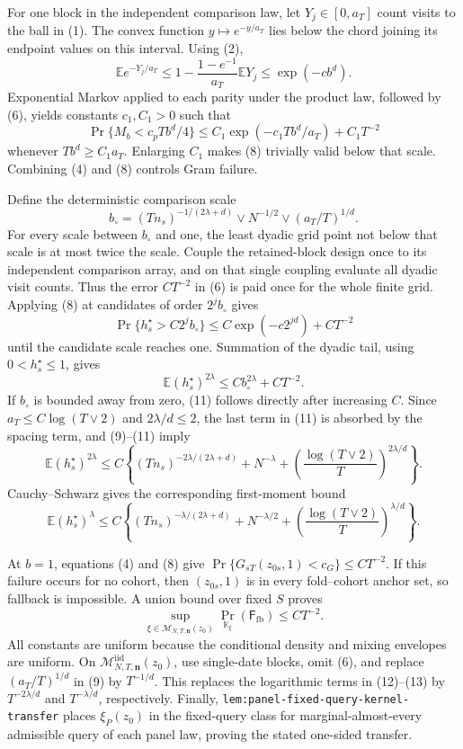 For one block in the independent comparison law, let \(Y_j\in[0,a_T]\) count visits to the ball in (1).  The convex function \(y\mapsto e^{-y/a_T}\) lies below the chord joining its endpoint values on this interval.  Using (2),
\[
 \mathbb Ee^{-Y_j/a_T}
 \le1-\frac{1-e^{-1}}{a_T}\mathbb EY_j
 \le\exp(-c b^d).                                          \tag{7}
\]
Exponential Markov applied to each parity under the product law, followed by (6), yields constants \(c_1,C_1>0\) such that
\[
 \Pr\{M_b<c_pTb^d/4\}
 \le C_1\exp(-c_1Tb^d/a_T)+C_1T^{-2}                       \tag{8}
\]
whenever \(Tb^d\ge C_1a_T\).  Enlarging \(C_1\) makes (8) trivially valid below that scale.  Combining (4) and (8) controls Gram failure.

Define the deterministic comparison scale
\[
 b_\circ=(Tn_s)^{-1/(2\lambda+d)}\vee N^{-1/2}
 \vee(a_T/T)^{1/d}.                                        \tag{9}
\]
For every scale between \(b_\circ\) and one, the least dyadic grid point not below that scale is at most twice the scale.  Couple the retained-block design once to its independent comparison array, and on that single coupling evaluate all dyadic visit counts.  Thus the error \(CT^{-2}\) in (6) is paid once for the whole finite grid.  Applying (8) at candidates of order \(2^jb_\circ\) gives
\[
 \Pr\{h_s^\star>C2^jb_\circ\}
 \le C\exp(-c2^{jd})+CT^{-2}                               \tag{10}
\]
until the candidate scale reaches one.  Summation of the dyadic tail, using \(0<h_s^\star\le1\), gives
\[
 \mathbb E(h_s^\star)^{2\lambda}
 \le Cb_\circ^{2\lambda}+CT^{-2}.                         \tag{11}
\]
If \(b_\circ\) is bounded away from zero, (11) follows directly after increasing \(C\).  Since \(a_T\le C\log(T\vee2)\) and \(2\lambda/d\le2\), the last term in (11) is absorbed by the spacing term, and (9)--(11) imply
\[
 \mathbb E(h_s^\star)^{2\lambda}
 \le C\left\{(Tn_s)^{-2\lambda/(2\lambda+d)}+N^{-\lambda}
 +\left(\frac{\log(T\vee2)}{T}\right)^{2\lambda/d}\right\}. \tag{12}
\]
Cauchy--Schwarz gives the corresponding first-moment bound
\[
 \mathbb E(h_s^\star)^\lambda
 \le C\left\{(Tn_s)^{-\lambda/(2\lambda+d)}+N^{-\lambda/2}
 +\left(\frac{\log(T\vee2)}{T}\right)^{\lambda/d}\right\}. \tag{13}
\]

At \(b=1\), equations (4) and (8) give
\(\Pr\{G_{sT}(z_{0s},1)<c_G\}\le CT^{-2}\).  If this failure occurs for no cohort, then \((z_{0s},1)\) is in every fold--cohort anchor set, so fallback is impossible.  A union bound over fixed \(S\) proves
\[
 \sup_{\xi\in\mathcal M_{N,T,\mathbf n}(z_0)}
 \Pr_{\mathbb K_\xi}(\mathsf F_{\mathrm{fb}})\le CT^{-2}. \tag{14}
\]
All constants are uniform because the conditional density and mixing envelopes are uniform.  On
\(\mathcal M^{\mathrm{iid}}_{N,T,\mathbf n}(z_0)\), use single-date blocks, omit (6), and replace \((a_T/T)^{1/d}\) in (9) by \(T^{-1/d}\).  This replaces the logarithmic terms in (12)--(13) by \(T^{-2\lambda/d}\) and \(T^{-\lambda/d}\), respectively.  Finally, \texttt{lem:panel-fixed-query-kernel-transfer} places \(\xi_P(z_0)\) in the fixed-query class for marginal-almost-every admissible query of each panel law, proving the stated one-sided transfer.

